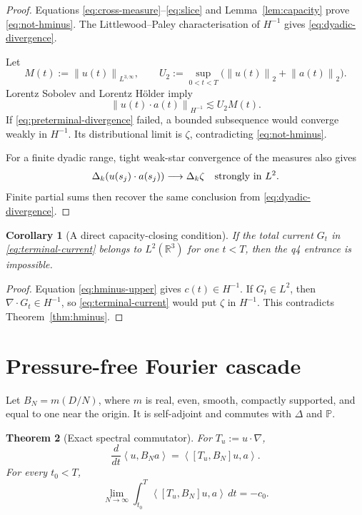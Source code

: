 \documentclass[11pt]{article}
\newtheorem{theorem}{Theorem}
\newtheorem{corollary}[theorem]{Corollary}
\theoremstyle{remark}
\newcommand{\R}{\mathbb R}
\newcommand{\Pj}{\mathbb P}
\newcommand{\ip}[2]{\left\langle #1,#2\right\rangle}
\newcommand{\norm}[1]{\left\|#1\right\|}
\begin{document}
\begin{proof}
Equations \eqref{eq:cross-measure}--\eqref{eq:slice} and
Lemma~\ref{lem:capacity} prove \eqref{eq:not-hminus}.
The Littlewood--Paley characterisation of \(H^{-1}\) gives
\eqref{eq:dyadic-divergence}.

Let
\[
 M(t):=\norm{u(t)}_{L^{3,\infty}},
 \qquad
 U_2:=\sup_{0<t<T}\bigl(\norm{u(t)}_2+\norm{a(t)}_2\bigr).
\]
Lorentz Sobolev and Lorentz H\"older imply
\begin{equation}
 \label{eq:hminus-upper}
 \norm{u(t)\cdot a(t)}_{H^{-1}}
 \lesssim U_2M(t).
\end{equation}
If \eqref{eq:preterminal-divergence} failed, a bounded subsequence
would converge weakly in \(H^{-1}\).  Its distributional limit is
\(\zeta\), contradicting \eqref{eq:not-hminus}.

For a finite dyadic range, tight weak-star convergence of the measures
also gives
\[
 \Delta_k(u(s_j)\cdot a(s_j))
 \longrightarrow\Delta_k\zeta
 \quad\hbox{strongly in }L^2.
\]
Finite partial sums then recover the same conclusion from
\eqref{eq:dyadic-divergence}.
\end{proof}

\begin{corollary}[A direct capacity-closing condition]
\label{cor:l2-current}
If the total current \(G_t\) in \eqref{eq:terminal-current} belongs to
\(L^2(\R^3)\) for one \(t<T\), then the q4 entrance is impossible.
\end{corollary}

\begin{proof}
Equation \eqref{eq:hminus-upper} gives \(c(t)\in H^{-1}\).
If \(G_t\in L^2\), then \(\nabla\cdot G_t\in H^{-1}\), so
\eqref{eq:terminal-current} would put \(\zeta\) in \(H^{-1}\).
This contradicts Theorem~\ref{thm:hminus}.
\end{proof}

\section{Pressure-free Fourier cascade}

Let \(B_N=m(D/N)\), where \(m\) is real, even, smooth, compactly
supported, and equal to one near the origin.  It is self-adjoint and
commutes with \(\Delta\) and \(\Pj\).

\begin{theorem}[Exact spectral commutator]
\label{thm:commutator}
For \(T_u:=u\cdot\nabla\),
\begin{equation}
 \label{eq:spectral-identity}
 \boxed{
 \frac d{dt}\ip{u}{B_Na}
 =
 \ip{[T_u,B_N]u}{a}.
 }
\end{equation}
For every \(t_0<T\),
\begin{equation}
 \label{eq:spectral-cascade}
 \boxed{
 \lim_{N\to\infty}
 \int_{t_0}^{T}\ip{[T_u,B_N]u}{a}\,dt
 =
 -c_0.
 }
\end{equation}
\end{theorem}
\end{document}
